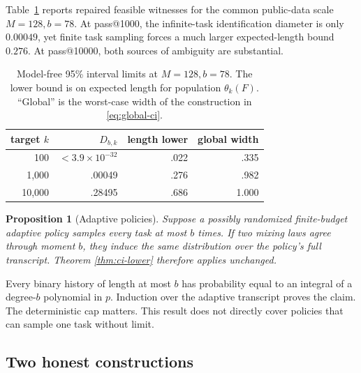 \documentclass[twoside]{article}
\newtheorem{proposition}{Proposition}
\begin{document}
Table~\ref{tab:limits} reports repaired feasible witnesses for the common public-data scale \(M=128,b=78\). At pass@1000, the infinite-task identification diameter is only \(0.00049\), yet finite task sampling forces a much larger expected-length bound \(0.276\). At pass@10000, both sources of ambiguity are substantial.

\begin{table}[t]
\caption{Model-free 95\% interval limits at \(M=128,b=78\). The lower bound
is on expected length for population \(\theta_k(F)\). ``Global'' is the worst-case width of the construction in \eqref{eq:global-ci}.}
\label{tab:limits}
\centering
\small
\begin{tabular}{rrrr}
\toprule
target \(k\) & \(D_{b,k}\) & length lower & global width\\
\midrule
100   & \(<3.9\!\times\!10^{-32}\) & .022 & .335\\
1,000 & .00049 & .276 & .982\\
10,000& .28495 & .686 & 1.000\\
\bottomrule
\end{tabular}
\end{table}

\begin{proposition}[Adaptive policies]
\label{prop:adaptive}
Suppose a possibly randomized finite-budget adaptive policy samples every task at most \(b\) times. If two mixing laws agree through moment \(b\), they induce the same distribution over the policy's full transcript. Theorem \ref{thm:ci-lower} therefore applies unchanged.
\end{proposition}

Every binary history of length at most \(b\) has probability equal to an integral of a degree-\(b\) polynomial in \(p\). Induction over the adaptive transcript proves the claim. The deterministic cap matters. This result does not directly cover policies that can sample one task without limit.

\subsection{Two honest constructions}
\end{document}
